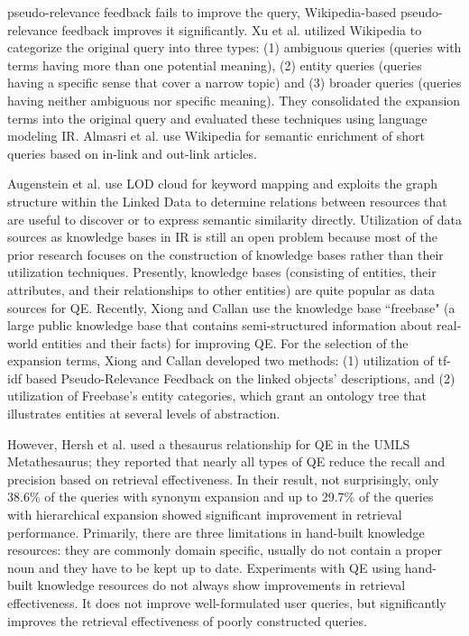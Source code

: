 pseudo-relevance feedback fails to improve the query, Wikipedia-based pseudo-relevance feedback improves it significantly. Xu et al. \cite{xu2009query} utilized Wikipedia to categorize the original query into three types: (1) ambiguous queries (queries with terms having more than one potential meaning), (2) entity queries (queries having a specific sense that cover a narrow topic)  and (3) broader queries (queries having neither ambiguous nor specific meaning). They consolidated the expansion terms into the original query and evaluated these techniques using language modeling IR. Almasri et al. \cite{almasri2013wikipedia} use Wikipedia for semantic enrichment of short queries based on in-link and out-link articles.

Augenstein et al. \cite{augenstein2013mapping} use  LOD cloud for keyword mapping and exploits the graph structure within the Linked Data to determine relations between resources that are useful to discover or to express semantic similarity directly. Utilization of data sources as knowledge bases in IR is still an open problem because most of the prior research focuses on the construction of knowledge bases rather than their utilization techniques. Presently, knowledge bases (consisting of entities, their attributes, and their relationships to other entities) are quite popular as data sources for QE. Recently, Xiong and Callan \cite{xiong2015query} use the knowledge base ``freebase" (a large public knowledge base that contains semi-structured information about real-world entities and their facts) for improving  QE. For the selection of the expansion terms,  Xiong and Callan \cite{xiong2015query} developed two methods: (1) utilization of  tf-idf based Pseudo-Relevance Feedback on the linked objects' descriptions, and (2) utilization of Freebase's entity categories, which grant an ontology tree that illustrates entities at several levels of abstraction.

However, Hersh et al. \cite{hersh2000assessing} used a thesaurus relationship for QE in the UMLS Metathesaurus; they reported that nearly all types of QE reduce the recall and precision based on retrieval effectiveness. In their result, not surprisingly, only 38.6\% of the queries with synonym expansion and up to 29.7\% of the queries with hierarchical expansion showed significant improvement in retrieval performance. 
Primarily, there are three limitations in hand-built knowledge resources: they are commonly domain specific, usually do not contain a proper noun and they have to be kept up to date. Experiments with QE using hand-built knowledge resources do not always show  improvements in retrieval effectiveness. It does not improve well-formulated user queries, but significantly improves the retrieval effectiveness of poorly constructed queries.  
